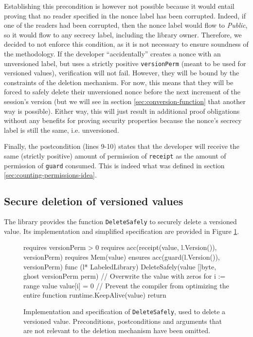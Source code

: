 Establishing this precondition is however not possible because it would entail proving that no reader specified in the nonce label has been corrupted. Indeed, if one of the readers had been corrupted, then the nonce label would flow to \emph{Public}, so it would flow to any secrecy label, including the library owner.
Therefore, we decided to not enforce this condition, as it is not necessary to ensure soundness of the methodology.
If the developer “accidentally” creates a nonce with an unversioned label, but uses a strictly positive \texttt{versionPerm} (meant to be used for versioned values), verification will not fail.
However, they will be bound by the constraints of the deletion mechanism. For now, this means that they will be forced to safely delete their unversioned nonce before the next increment of the session's version (but we will see in section \ref{sec:conversion-function} that another way is possible).
Either way, this will just result in additional proof obligations without any benefits for proving security properties because the nonce's secrecy label is still the same, i.e. unversioned.

Finally, the postcondition (lines 9-10) states that the developer will receive the same (strictly positive) amount of permission of \texttt{receipt} as the amount of permission of \texttt{guard} consumed. This is indeed what was defined in section \ref{sec:counting-permissions-idea}.

\subsection{Secure deletion of versioned values}
\label{sec:secure-deletion-of-versioned-values}

The library provides the function \texttt{DeleteSafely} to securely delete a versioned value. Its implementation and simplified specification are provided in Figure \ref{lst:delete-safely}.

\begin{figure}
    \begin{gobra}
requires versionPerm > 0
requires acc(receipt(value, l.Version()), versionPerm)
requires Mem(value)
ensures  acc(guard(l.Version()), versionPerm)
func (l* LabeledLibrary) DeleteSafely(value []byte,
    ghost versionPerm perm) {
    // Overwrite the value with zeros
    for i := range value {
        value[i] = 0
    }
    // Prevent the compiler from optimizing the entire function
    runtime.KeepAlive(value)
    return
}
    \end{gobra}
    \caption{Implementation and specification of \texttt{DeleteSafely}, used to delete a versioned value. Preconditions, postconditions and arguments that are not relevant to the deletion mechanism have been omitted.}
    \label{lst:delete-safely}
\end{figure}

